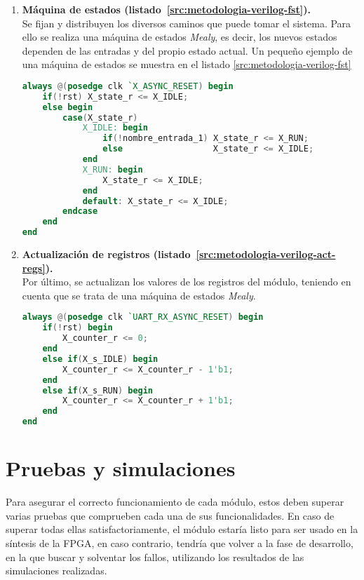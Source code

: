 \begin{enumerate}
    \item{\textbf{Máquina de estados (listado~\ref{src:metodologia-verilog-fst}).}} \\
    Se fijan y distribuyen los diversos caminos que puede tomar el sistema. Para ello se realiza una máquina de estados \emph{Mealy}\cite{mealy1955method}, es decir, los nuevos estados dependen de las entradas y del propio estado actual. Un pequeño ejemplo de una máquina de estados se muestra en el listado \ref{src:metodologia-verilog-fst}
    \begin{lstlisting}[language=Verilog,
        caption={Ejemplo de máquina de estados.},
        label=src:metodologia-verilog-fst]
always @(posedge clk `X_ASYNC_RESET) begin
    if(!rst) X_state_r <= X_IDLE;
    else begin
        case(X_state_r)
            X_IDLE: begin
                if(!nombre_entrada_1) X_state_r <= X_RUN;
                else                  X_state_r <= X_IDLE;
            end
            X_RUN: begin
                X_state_r <= X_IDLE;
            end
            default: X_state_r <= X_IDLE;
        endcase
    end
end
    \end{lstlisting}

    \item{\textbf{Actualización de registros (listado~\ref{src:metodologia-verilog-act-regs}).}} \\
    Por último, se actualizan los valores de los registros del módulo, teniendo en cuenta que se trata de una máquina de estados \emph{Mealy}\cite{barkalov2005design}.
    \begin{lstlisting}[language=Verilog,
        caption={Ejemplo de actualización de registros.},
        label=src:metodologia-verilog-act-regs]
always @(posedge clk `UART_RX_ASYNC_RESET) begin
    if(!rst) begin
        X_counter_r <= 0;
    end
    else if(X_s_IDLE) begin
        X_counter_r <= X_counter_r - 1'b1;
    end
    else if(X_s_RUN) begin
        X_counter_r <= X_counter_r + 1'b1;
    end
end
    \end{lstlisting}
\end{enumerate}



\section{Pruebas y simulaciones}
\label{ch:contribuciones:pruebas}
Para asegurar el correcto funcionamiento de cada módulo, estos deben superar varias pruebas que comprueben cada una de sus funcionalidades. En caso de superar todas ellas satisfactoriamente, el módulo estaría listo para ser usado en la síntesis de la FPGA, en caso contrario, tendría que volver a la fase de desarrollo, en la que buscar y solventar los fallos, utilizando los resultados de las simulaciones realizadas.

